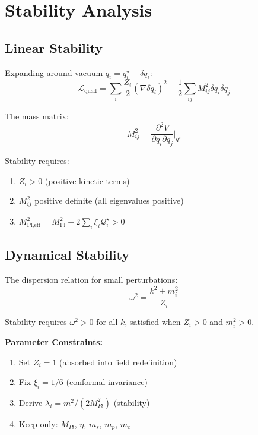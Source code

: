 \documentclass[openany]{memoir}
\theoremstyle{definition}
\theoremstyle{plain}
\theoremstyle{remark}
\begin{document}
\chapter{Stability Analysis}
\label{app:stability}

\section{Linear Stability}

Expanding around vacuum $q_i = q_i^\star + \delta q_i$:
\begin{equation}
\mathcal{L}_{\text{quad}} = \sum_i \frac{Z_i}{2}(\nabla \delta q_i)^2 - \frac{1}{2}\sum_{ij} M_{ij}^2 \delta q_i \delta q_j
\end{equation}

The mass matrix:
\begin{equation}
M_{ij}^2 = \frac{\partial^2 V}{\partial q_i \partial q_j}\bigg|_{q^\star}
\end{equation}

Stability requires:
\begin{enumerate}
\item $Z_i > 0$ (positive kinetic terms)
\item $M_{ij}^2$ positive definite (all eigenvalues positive)
\item $M_{\text{Pl,eff}}^2 = M_{\text{Pl}}^2 + 2\sum_i \xi_i \mathcal{Q}_i^{\star} > 0$
\end{enumerate}

\section{Dynamical Stability}

The dispersion relation for small perturbations:
\begin{equation}
\omega^2 = \frac{k^2 + m_i^2}{Z_i}
\end{equation}

Stability requires $\omega^2 > 0$ for all $k$, satisfied when $Z_i > 0$ and $m_i^2 > 0$.

\textbf{Parameter Constraints:}
\begin{enumerate}
\item Set $Z_i = 1$ (absorbed into field redefinition)
\item Fix $\xi_i = 1/6$ (conformal invariance)
\item Derive $\lambda_i = m^2 / (2 M_{Pl}^2)$ (stability)
\item Keep only: $M_{Pl}$, $\eta$, $m_s$, $m_p$, $m_c$
\end{enumerate}
\end{document}

